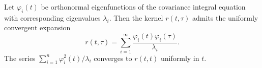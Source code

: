 Let $\varphi_i(t)$ be orthonormal eigenfunctions of the covariance integral equation with corresponding eigenvalues $\lambda_i$. Then the kernel $r(t,\tau)$ admits the uniformly convergent expansion
$$r(t,\tau) = \sum_{i=1}^{\infty} \frac{\varphi_i(t) \varphi_i(\tau)}{\lambda_i}.$$
The series $\sum_{i=1}^n \varphi_i^2(t)/\lambda_i$ converges to $r(t,t)$ uniformly in $t$.
